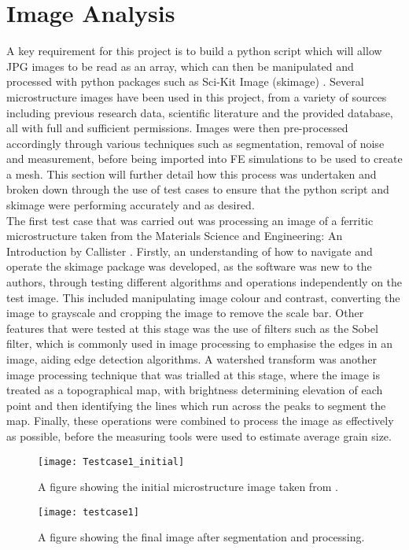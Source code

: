 \documentclass[\report.tex]{subfiles}
\begin{document}
\section{Image Analysis}
\noindent A key requirement for this project is to build a python script which will allow JPG images to be read as an array, which can then be manipulated and processed with python packages such as Sci-Kit Image (skimage) \cite{scikitimage}. Several microstructure images have been used in this project, from a variety of sources including previous research data, scientific literature and the provided database, all with full and sufficient permissions. Images were then pre-processed accordingly through various techniques such as segmentation, removal of noise and measurement, before being imported into FE simulations to be used to create a mesh. This section will further detail how this process was undertaken and broken down through the use of test cases to ensure that the python script and skimage were performing accurately and as desired.\\

\noindent The first test case that was carried out was processing an image of a ferritic microstructure taken from the Materials Science and Engineering: An Introduction by Callister \cite{CallisterJrWilliamD2000MSaE}. Firstly, an understanding of how to navigate and operate the skimage package was developed, as the software was new to the authors, through testing different algorithms and operations independently on the test image. This included manipulating image colour and contrast, converting the image to grayscale and cropping the image to remove the scale bar. Other features that were tested at this stage was the use of filters such as the Sobel filter, which is commonly used in image processing to emphasise the edges in an image, aiding edge detection algorithms. A watershed transform was another image processing technique that was trialled at this stage, where the image is treated as a topographical map, with brightness determining elevation of each point and then identifying the lines which run across the peaks to segment the map. Finally, these operations were combined to process the image as effectively as possible, before the measuring tools were used to estimate average grain size.\\


\begin{figure}
\centering
\parbox{5cm}{
\texttt{[image: Testcase1\_initial]}
\caption{A figure showing the initial microstructure image taken from \cite{CallisterJrWilliamD2000MSaE}.}
\label{fig:2figsA}}
\qquad
\begin{minipage}{6cm}
\texttt{[image: testcase1]}
\caption{A figure showing the final image after segmentation and processing.}
\label{fig:2figsB}
\end{minipage}
\end{figure}
\end{document}
